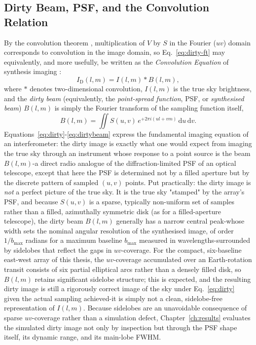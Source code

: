 \subsection{Dirty Beam, PSF, and the Convolution Relation}
\label{subsec:dirty-beam}
By the convolution theorem \citep{taylor1999synthesis}, multiplication of $V$
by $S$ in the Fourier ($uv$) domain corresponds to convolution in the image
domain, so Eq.~\eqref{eq:dirty-ft} may equivalently, and more usefully, be
written as the \emph{Convolution Equation} of synthesis imaging
\citep{taylor1999synthesis}:
\begin{equation}
  I_\mathrm{D}(l,m) = I(l,m) * B(l,m),
  \label{eq:dirty}
\end{equation}
where $*$ denotes two-dimensional convolution, $I(l,m)$ is the true sky
brightness, and the \emph{dirty beam} (equivalently, the
\emph{point-spread function}, PSF, or \emph{synthesised beam}) $B(l,m)$ is
simply the Fourier transform of the sampling function itself,
\begin{equation}
  B(l,m) = \iint S(u,v)\,e^{+2\pi i(ul+vm)}\,\mathrm{d}u\,\mathrm{d}v .
  \label{eq:dirtybeam}
\end{equation}
Equations~\eqref{eq:dirty}-\eqref{eq:dirtybeam} \citep{taylor1999synthesis,tms2017}
express the fundamental imaging equation of an interferometer: the dirty
image is exactly what one would expect from imaging the true sky through an
instrument whose response to a point source is the beam $B(l,m)$-a direct
radio analogue of the diffraction-limited PSF of an optical telescope, except
that here the PSF is determined not by a filled aperture but by the discrete
pattern of sampled $(u,v)$ points. Put practically: the dirty image is
\emph{not} a perfect picture of the true sky. It is the true sky "stamped"
by the array's PSF, and because $S(u,v)$ is a sparse, typically non-uniform
set of samples rather than a filled, azimuthally symmetric disk (as for a
filled-aperture telescope), the dirty beam $B(l,m)$ generally has a narrow
central peak-whose width sets the nominal angular resolution of the
synthesised image, of order $1/b_\mathrm{max}$ radians for a maximum baseline
$b_\mathrm{max}$ measured in wavelengths-surrounded by sidelobes that reflect
the gaps in $uv$-coverage. For the compact, six-baseline east-west array of
this thesis, the $uv$-coverage accumulated over an Earth-rotation transit
consists of six partial elliptical arcs rather than a densely filled disk, so
$B(l,m)$ retains significant sidelobe structure; this is expected, and the
resulting dirty image is still a rigorously correct image of the sky under
Eq.~\eqref{eq:dirty} given the actual sampling achieved-it is simply not a
clean, sidelobe-free representation of $I(l,m)$. Because sidelobes are an
unavoidable consequence of sparse $uv$-coverage rather than a simulation
defect, Chapter~\ref{ch:results} evaluates the simulated dirty image not only
by inspection but through the PSF shape itself, its dynamic range, and its
main-lobe FWHM.

